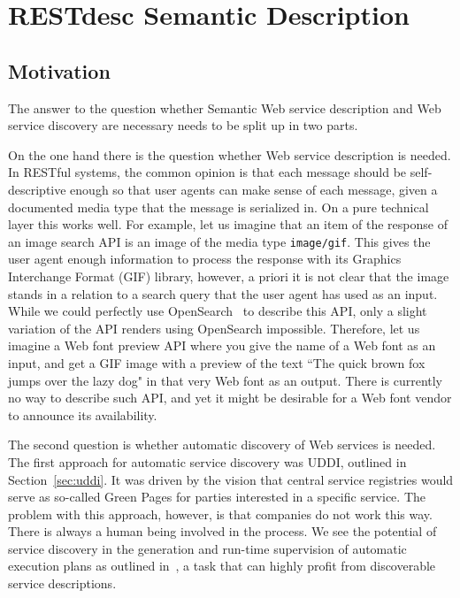 \documentclass[runningheads,a4paper, twocolumn]{llncs}
\begin{document}
\section{RESTdesc Semantic Description} \label{sec:restdesc-semantic-description}
\label{RESTdesc}
\subsection{Motivation}
The answer to the question whether Semantic Web service description and Web service discovery are necessary needs to be split up in two parts.

On the one hand there is the question whether Web service description is needed. In RESTful systems, the common opinion is that each message should be self-descriptive enough so that user agents can make sense of each message, given a documented media type that the message is serialized in. On a pure technical layer this works well. For example, let us imagine that an item of the response of an image search API is an image of the media type \texttt{image/gif}. This gives the user agent enough information to process the response with its Graphics Interchange Format (GIF) library, however, a priori it is not clear that the image stands in a relation to a search query that the user agent has used as an input. While we could perfectly use OpenSearch~\cite{OpenSearch} to describe this API, only a slight variation of the API renders using OpenSearch impossible. Therefore, let us imagine a Web font preview API where you give the name of a Web font as an input, and get a GIF image with a preview of the text ``The quick brown fox jumps over the lazy dog" in that very Web font as an output. There is currently no way to describe such API, and yet it might be desirable for a Web font vendor to announce its availability. 

The second question is whether automatic discovery of Web services is needed. The first approach for automatic service discovery was UDDI, outlined in Section~\ref{sec:uddi}. It was driven by the vision that central service registries would serve as so-called Green Pages for parties interested in a specific service. The problem with this approach, however, is that companies do not work this way. There is always a human being involved in the process\cite{UDDIDiscontinue}. We see the potential of service discovery in the generation and run-time supervision of automatic execution plans as outlined in~\cite{Verborgh:2011p4792}, a task that can highly profit from discoverable service descriptions.
\end{document}
